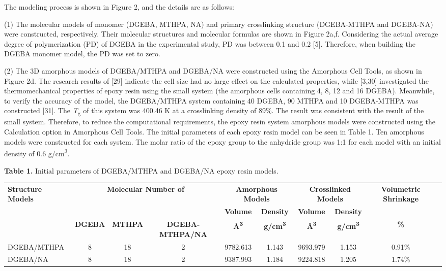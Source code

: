 \documentclass{article}
\begin{document}
The modeling process is shown in Figure 2, and the details are as follows:

(1) The molecular models of monomer (DGEBA, MTHPA, NA) and primary crosslinking structure (DGEBA-MTHPA and DGEBA-NA) were constructed, respectively. Their molecular structures and molecular formulas are shown in Figure 2a,f. Considering the actual average degree of polymerization (PD) of DGEBA in the experimental study, PD was between 0.1 and 0.2 [5]. Therefore, when building the DGEBA monomer model, the PD was set to zero.

(2) The 3D amorphous models of DGEBA/MTHPA and DGEBA/NA were constructed using the Amorphous Cell Tools, as shown in Figure 2d. The research results of [29] indicate the cell size had no large effect on the calculated properties, while [3,30] investigated the thermomechanical properties of epoxy resin using the small system (the amorphous cells containing 4, 8, 12 and 16 DGEBA). Meanwhile, to verify the accuracy of the model, the DGEBA/MTHPA system containing 40 DGEBA, 90 MTHPA and 10 DGEBA-MTHPA was constructed [31]. The \emph{T}\textsubscript{g} of this system was 400.46 K at a crosslinking density of 89\%. The result was consistent with the result of the small system. Therefore, to reduce the computational requirements, the epoxy resin system amorphous models were constructed using the Calculation option in Amorphous Cell Tools. The initial parameters of each epoxy resin model can be seen in Table 1. Ten amorphous models were constructed for each system. The molar ratio of the epoxy group to the anhydride group was 1:1 for each model with an initial density of 0.6 g/cm\textsuperscript{3}.

\begin{center}
\noindent\textbf{Table 1.} Initial parameters of DGEBA/MTHPA and DGEBA/NA epoxy resin models.

\smallskip
\small
\begin{tabular}{lccccccccc}
\toprule
\textbf{Structure Models} & \multicolumn{3}{c}{\textbf{Molecular Number of}} & \multicolumn{2}{c}{\textbf{Amorphous Models}} & \multicolumn{2}{c}{\textbf{Crosslinked Models}} & \textbf{Volumetric Shrinkage} \\
 & & & & \textbf{Volume} & \textbf{Density} & \textbf{Volume} & \textbf{Density} & \\
 & \textbf{DGEBA} & \textbf{MTHPA} & \textbf{DGEBA-MTHPA/NA} & \textbf{Å\textsuperscript{3}} & \textbf{g/cm\textsuperscript{3}} & \textbf{Å\textsuperscript{3}} & \textbf{g/cm\textsuperscript{3}} & \textbf{\%} \\
\midrule
DGEBA/MTHPA & 8 & 18 & 2 & 9782.613 & 1.143 & 9693.979 & 1.153 & 0.91\% \\
DGEBA/NA & 8 & 18 & 2 & 9387.993 & 1.184 & 9224.818 & 1.205 & 1.74\% \\
\bottomrule
\end{tabular}
\end{center}
\end{document}
